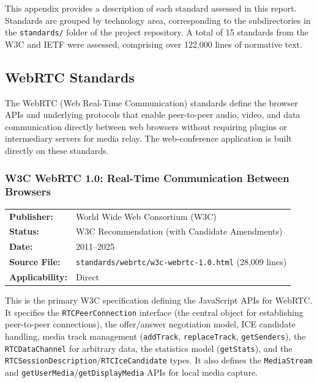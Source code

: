 \documentclass[11pt,letterpaper]{article}
\begin{document}
This appendix provides a description of each standard assessed in this report. Standards are grouped by technology area, corresponding to the subdirectories in the \texttt{standards/} folder of the project repository. A total of 15 standards from the W3C and IETF were assessed, comprising over 122,000 lines of normative text.

\subsection{WebRTC Standards}
\label{app:webrtc-standards}

The WebRTC (Web Real-Time Communication) standards define the browser APIs and underlying protocols that enable peer-to-peer audio, video, and data communication directly between web browsers without requiring plugins or intermediary servers for media relay. The web-conference application is built directly on these standards.

\subsubsection{W3C WebRTC 1.0: Real-Time Communication Between Browsers}
\label{app:w3c-webrtc}

\begin{tabular}{ll}
\textbf{Publisher:} & World Wide Web Consortium (W3C) \\
\textbf{Status:} & W3C Recommendation (with Candidate Amendments) \\
\textbf{Date:} & 2011--2025 \\
\textbf{Source File:} & \texttt{standards/webrtc/w3c-webrtc-1.0.html} (28,009 lines) \\
\textbf{Applicability:} & Direct \\
\end{tabular}

\vspace{0.5em}
This is the primary W3C specification defining the JavaScript APIs for WebRTC. It specifies the \texttt{RTCPeerConnection} interface (the central object for establishing peer-to-peer connections), the offer/answer negotiation model, ICE candidate handling, media track management (\texttt{addTrack}, \texttt{replaceTrack}, \texttt{getSenders}), the \texttt{RTCDataChannel} for arbitrary data, the statistics model (\texttt{getStats}), and the \texttt{RTCSessionDescription}/\texttt{RTCIceCandidate} types. It also defines the \texttt{MediaStream} and \texttt{getUserMedia}/\texttt{getDisplayMedia} APIs for local media capture.
\end{document}
